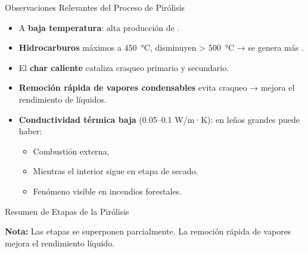 \documentclass[../../main.tex]{subfiles}
\begin{document}
\begin{frame}{Observaciones Relevantes del Proceso de Pirólisis}
\small
\begin{itemize}
  \item A \textbf{baja temperatura}: alta producción de .
  \item \textbf{Hidrocarburos} máximos a \SI{450}{\degreeCelsius}, disminuyen > \SI{500}{\degreeCelsius} → se genera más .
  \item El \textbf{char caliente} cataliza craqueo primario y secundario.
  \item \textbf{Remoción rápida de vapores condensables} evita craqueo → mejora el rendimiento de líquidos.
  \item \textbf{Conductividad térmica baja} (0.05–0.1 W/m·K): en leños grandes puede haber:
  \begin{itemize}
    \item Combustión externa,
    \item Mientras el interior sigue en etapa de secado.
    \item Fenómeno visible en incendios forestales.
  \end{itemize}
\end{itemize}
\end{frame}

\begin{frame}{Resumen de Etapas de la Pirólisis}
\small
\begin{center}
\end{center}
\smallskip
\textbf{Nota:} Las etapas se superponen parcialmente. La remoción rápida de vapores mejora el rendimiento líquido.
\end{frame}
\end{document}
